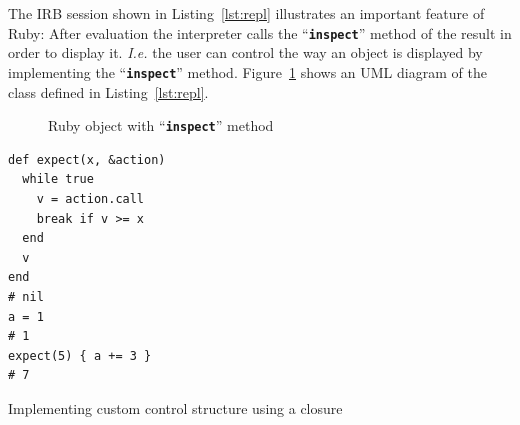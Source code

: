 \documentclass[10pt,journal,compsoc]{joser13}
\newcommand{\code}[1]{``\texttt{\textbf{\textcolor{codegray}{\small{#1}}}}''}
\newcommand{\fig}[1]{Figure~\ref{fig:#1}}
\newcommand{\lst}[1]{Listing~\ref{lst:#1}}
\begin{document}
The \ac{IRB} session shown in \lst{repl} illustrates an important feature of Ruby: After evaluation the interpreter calls the \code{inspect} method of the result in order to display it. \emph{I.e.} the user can control the way an object is displayed by implementing the \code{inspect} method. \fig{object} shows an UML diagram of the class defined in \lst{repl}.
\begin{figure}[htbp]
  \begin{center}
    \caption{Ruby object with \code{inspect} method\label{fig:object}}
  \end{center}
\end{figure}

\begin{listing}[htbp]
  \begin{verbatim}
def expect(x, &action)
  while true
    v = action.call
    break if v >= x
  end
  v
end
# nil
a = 1
# 1
expect(5) { a += 3 }
# 7
  \end{verbatim}
  \caption{Implementing custom control structure using a closure\label{lst:closure}}
\end{listing}









\end{document}
